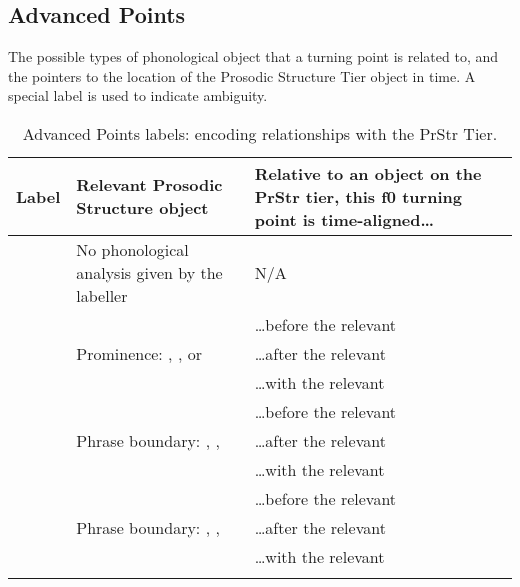 \documentclass[11pt, twoside]{memoir}
\def\textlabel#1{{\relsize{-.5}\fontspec[Mapping=tex-text]{Roboto Mono}{#1}}}
\begin{document}
\subsection*{Advanced Points}

The possible types of phonological object that a turning point is related to, and the pointers to the location of the Prosodic Structure Tier object in time. A special label is used to indicate ambiguity.

\begin{longtable}{c>{\centering}p{.33\linewidth}>{\centering\arraybackslash}p{.45\linewidth}} \toprule \textbf{Label} & \textbf{Relevant Prosodic Structure object} & \textbf{Relative to an object on the PrStr tier, this f0 turning point is time-aligned…}\tabularnewline
\midrule \endhead
\rowcolor{green}\textlabel{0} & No phonological analysis given by the labeller & N/A\tabularnewline
\midrule
\textlabel{*>} & & …before the relevant \textlabel{*}\tabularnewline
\textlabel{*<} & Prominence: \textlabel{*}, \textlabel{?*}, or \textlabel{**} & …after the relevant \textlabel{*}\tabularnewline
\textlabel{*@} & & …with the relevant \textlabel{*}\tabularnewline
\midrule
\textlabel{]>} & & …before the relevant \textlabel{]}\tabularnewline
\textlabel{]<} & Phrase boundary: \textlabel{]}, \textlabel{?]}, \textlabel{]]} & …after the relevant \textlabel{]}\tabularnewline
\textlabel{]@} & & …with the relevant \textlabel{]}\tabularnewline
\midrule
\textlabel{[>} & & …before the relevant \textlabel{[}\tabularnewline
\textlabel{[<} & Phrase boundary: \textlabel{[}, \textlabel{?[}, \textlabel{[[} & …after the relevant \textlabel{[}\tabularnewline
\textlabel{[@} & & …with the relevant \textlabel{[}\tabularnewline
\bottomrule
\caption{Advanced Points labels: encoding relationships with the PrStr Tier.}
\end{longtable}
\end{document}
